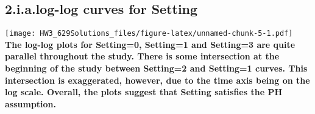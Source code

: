 \documentclass[
]{article}
\newenvironment{Shaded}{\begin{snugshade}}{\end{snugshade}}
\newcommand{\AttributeTok}[1]{\textcolor[rgb]{0.77,0.63,0.00}{#1}}
\newcommand{\DecValTok}[1]{\textcolor[rgb]{0.00,0.00,0.81}{#1}}
\newcommand{\FunctionTok}[1]{\textcolor[rgb]{0.00,0.00,0.00}{#1}}
\newcommand{\NormalTok}[1]{#1}
\newcommand{\OtherTok}[1]{\textcolor[rgb]{0.56,0.35,0.01}{#1}}
\newcommand{\SpecialCharTok}[1]{\textcolor[rgb]{0.00,0.00,0.00}{#1}}
\newcommand{\StringTok}[1]{\textcolor[rgb]{0.31,0.60,0.02}{#1}}
\begin{document}
\begin{Shaded}
\end{Shaded}

\hypertarget{i.a.log-log-curves-for-setting}{%
\subsection{2.i.a.log-log curves for
Setting}\label{i.a.log-log-curves-for-setting}}

\begin{Shaded}
\end{Shaded}

\texttt{[image: HW3\_629Solutions\_files/figure-latex/unnamed-chunk-5-1.pdf]}
\textbf{The log-log plots for Setting=0, Setting=1 and Setting=3 are
quite parallel throughout the study. There is some intersection at the
beginning of the study between Setting=2 and Setting=1 curves. This
intersection is exaggerated, however, due to the time axis being on the
log scale. Overall, the plots suggest that Setting satisfies the PH
assumption.}
\end{document}

